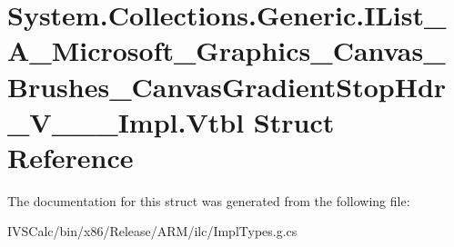 \hypertarget{struct_system_1_1_collections_1_1_generic_1_1_i_list___a___microsoft___graphics___canvas___brushf9db676bc8e14a38633fff21bc26b07d}{}\section{System.\+Collections.\+Generic.\+I\+List\+\_\+\+A\+\_\+\+Microsoft\+\_\+\+Graphics\+\_\+\+Canvas\+\_\+\+Brushes\+\_\+\+Canvas\+Gradient\+Stop\+Hdr\+\_\+\+V\+\_\+\+\_\+\+\_\+\+Impl.\+Vtbl Struct Reference}
\label{struct_system_1_1_collections_1_1_generic_1_1_i_list___a___microsoft___graphics___canvas___brushf9db676bc8e14a38633fff21bc26b07d}


The documentation for this struct was generated from the following file\+:\begin{DoxyCompactItemize}
\item 
I\+V\+S\+Calc/bin/x86/\+Release/\+A\+R\+M/ilc/Impl\+Types.\+g.\+cs\end{DoxyCompactItemize}
